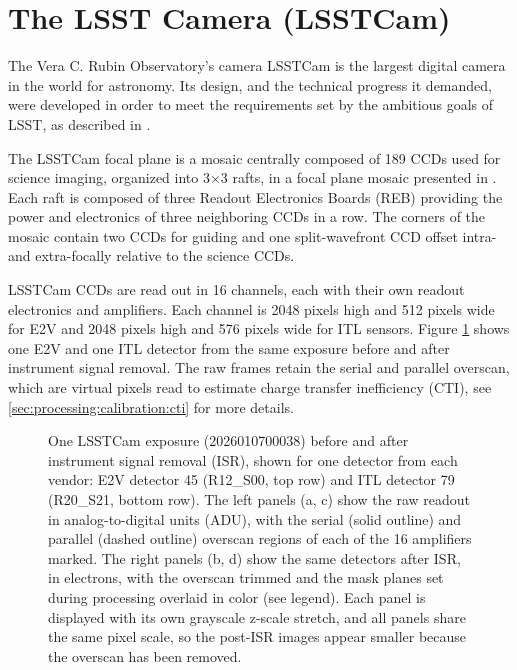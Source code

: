 \section{The LSST Camera (LSSTCam)} \label{sec:lsstcam}

The Vera C. Rubin Observatory's camera LSSTCam \cite{10.71929/rubin/2571927} is the largest digital camera in the world for astronomy.
Its design, and the technical progress it demanded, were developed in order to meet the requirements set by the ambitious goals of LSST, as described in \cite{2024SPIE13096E..1SR}.

The LSSTCam focal plane is a mosaic centrally composed of 189 CCDs used for science imaging, organized into 3$\times$3 rafts, in a focal plane mosaic presented in \citet{CTN-001}.
Each raft is composed of three Readout Electronics Boards (REB) providing the power and electronics of three neighboring CCDs in a row.
The corners of the mosaic contain two CCDs for guiding and one split-wavefront CCD offset intra- and extra-focally relative to the science CCDs. 

LSSTCam CCDs are read out in 16 channels, each with their own readout electronics and amplifiers.
Each channel is 2048 pixels high and 512 pixels wide for E2V and 2048 pixels high and 576 pixels wide for ITL sensors.
Figure \ref{fig:isr-before-after} shows one E2V and one ITL detector from the same exposure before and after instrument signal removal.
The raw frames retain the serial and parallel overscan, which are virtual pixels read to estimate charge transfer inefficiency (CTI), see \ref{sec:processing:calibration:cti} for more details.

\begin{figure}[t]
    \centering
    \caption{One LSSTCam exposure (2026010700038) before and after instrument signal removal (ISR), shown for one detector from each vendor: E2V detector 45 (R12\_S00, top row) and ITL detector 79 (R20\_S21, bottom row).
    The left panels (a, c) show the raw readout in analog-to-digital units (ADU), with the serial (solid outline) and parallel (dashed outline) overscan regions of each of the 16 amplifiers marked.
    The right panels (b, d) show the same detectors after ISR, in electrons, with the overscan trimmed and the mask planes set during processing overlaid in color (see legend).
    Each panel is displayed with its own grayscale z-scale stretch, and all panels share the same pixel scale, so the post-ISR images appear smaller because the overscan has been removed. }
    \label{fig:isr-before-after}
\end{figure}

